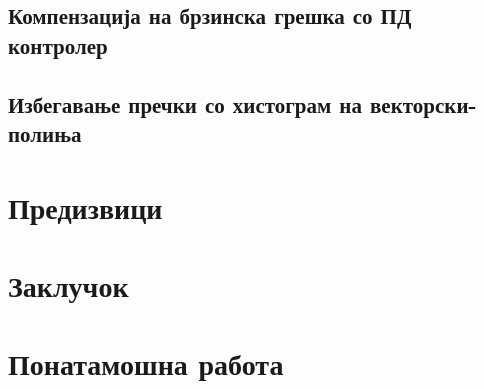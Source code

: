 \documentclass{article}
\begin{document}
\subsection{Компензација на брзинска грешка со ПД контролер}
\subsection{Избегавање пречки со хистограм на векторски-полиња}

\section{Предизвици}
\section{Заклучок}
\section{Понатамошна работа}
\end{document}
